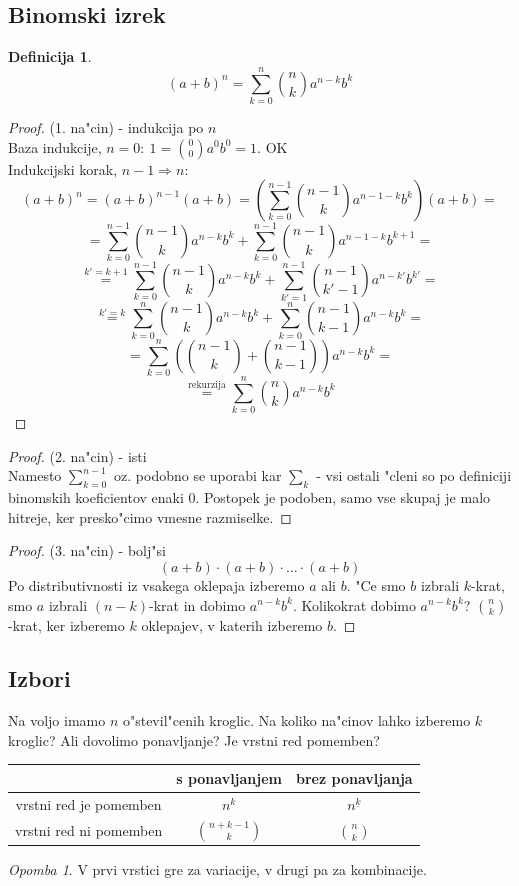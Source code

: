 \documentclass[a4paper,12pt]{article}
\theoremstyle{definition}
\newtheorem{defn}[counter]{Definicija}
\theoremstyle{remark}
\newtheorem*{rem}{Opomba}
\begin{document}
\subsection{Binomski izrek}
\begin{defn}
\[(a + b)^n = \sum_{k = 0}^{n}{\binom{n}{k} a^{n-k} b^k}\]
\end{defn}
\begin{proof}(1. na"cin) - indukcija po $n$\\
	Baza indukcije, $n = 0: \ 1 = \binom{0}{0} a^0b^0 = 1$. OK\\
	Indukcijski korak, $n - 1 \Rightarrow n$:
\[(a+b)^n = (a+b)^{n-1}(a+b) = (\sum_{k=0}^{n-1} \binom{n-1}{k} a^{n-1-k}b^k)(a+b) =\]
\[ = \sum_{k=0}^{n-1} \binom{n-1}{k} a^{n-k}b^k + \sum_{k=0}^{n-1} \binom{n-1}{k} a^{n-1-k}b^{k+1} =\]
\[\stackrel{k' = k + 1}{=} \sum_{k=0}^{n-1} \binom{n-1}{k} a^{n-k}b^k + \sum_{k'=1}^{n-1} \binom{n-1}{k'-1} a^{n-k'}b^{k'} = \]
\[\stackrel{k'=k}{=} \sum_{k=0}^{n} {\binom{n-1}{k}a^{n-k} b^k} + \sum_{k=0}^{n} {\binom{n-1}{k-1}a^{n-k} b^k} =\]
\[= \sum_{k=0}^n (\binom{n-1}{k} + \binom{n-1}{k-1})a^{n-k}b^k =\]
\[\stackrel{\text{rekurzija}}{=} \sum_{k=0}^n \binom{n}{k}a^{n-k}b^k\]
\end{proof}
\begin{proof}(2. na"cin) - isti\\
	Namesto $\sum_{k=0}^{n-1}$ oz. podobno se uporabi kar $\sum_k$ - vsi ostali "cleni so po definiciji binomskih koeficientov enaki 0. Postopek je podoben, samo vse skupaj je malo hitreje, ker presko"cimo vmesne razmiselke.
\end{proof}
\begin{proof}(3. na"cin) - bolj"si\\
\[(a+b) \cdot (a+b) \cdot \ldots \cdot (a+b)\]
Po distributivnosti iz vsakega oklepaja izberemo $a$ ali $b$. "Ce smo $b$ izbrali $k$-krat, smo $a$ izbrali $(n-k)$-krat in dobimo $a^{n-k}b^k$. Kolikokrat dobimo $a^{n-k}b^k$? $\binom{n}{k}$-krat, ker izberemo $k$ oklepajev, v katerih izberemo $b$.
\end{proof}


\subsection{Izbori}

Na voljo imamo $n$ o"stevil"cenih kroglic. Na koliko na"cinov lahko izberemo $k$ kroglic? Ali dovolimo ponavljanje? Je vrstni red pomemben?

\begin{tabular}{c|c|c}

 & s ponavljanjem & brez ponavljanja \\
\hline
vrstni red je pomemben & $n^k$ & $n^{\underline{k}}$\\
\hline
vrstni red ni pomemben & $\binom{n + k - 1}{k}$ & $\binom{n}{k}$
\end{tabular}
\begin{rem}
	V prvi vrstici gre za variacije, v drugi pa za kombinacije.
\end{rem}
\end{document}
